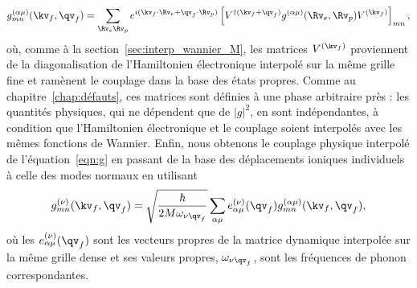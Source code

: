 \begin{equation}
    g_{mn}^{(\alpha\mu)}(\kv_f,\qv_f) = \sum_{\Rv_e\Rv_p}
    e^{i(\kv_f\cdot\Rv_e+\qv_f\cdot\Rv_p)}
    \left[V^{\dag(\kv_f+\qv_f)}g^{(\alpha\mu)}(\Rv_e,\Rv_p)V^{(\kv_f)}\right]_{mn},
    \label{eqn:g_interp}
\end{equation}
où, comme à la section~\ref{sec:interp_wannier_M}, les matrices $V^{(\kv_f)}$ proviennent de la diagonalisation de l'Hamiltonien électronique interpolé sur la même grille fine et ramènent le couplage dans la base des états propres. Comme au chapitre~\ref{chap:défauts}, ces matrices sont définies à une phase arbitraire près : les quantités physiques, qui ne dépendent que de $|g|^2$, en sont indépendantes, à condition que l'Hamiltonien électronique et le couplage soient interpolés avec les mêmes fonctions de Wannier. Enfin, nous obtenons le couplage physique interpolé de l'équation~\eqref{eqn:g} en passant de la base des déplacements ioniques individuels à celle des modes normaux en utilisant
\begin{equation}
        g_{mn}^{(\nu)}(\kv_f,\qv_f) =
    \sqrt{\frac{\hbar}{2M\omega_{\nu\qv_f}}}\sum_{\alpha\mu}
    e^{(\nu)}_{\alpha\mu}(\qv_f)g_{mn}^{(\alpha\mu)}(\kv_f,\qv_f),
    \label{eqn:g_modes}
\end{equation}
où les $e^{(\nu)}_{\alpha\mu}(\qv_f)$ sont les vecteurs propres de la matrice dynamique interpolée sur la même grille dense et ses valeurs propres, $\omega_{\nu\qv_f}$, sont les fréquences de phonon correspondantes.

